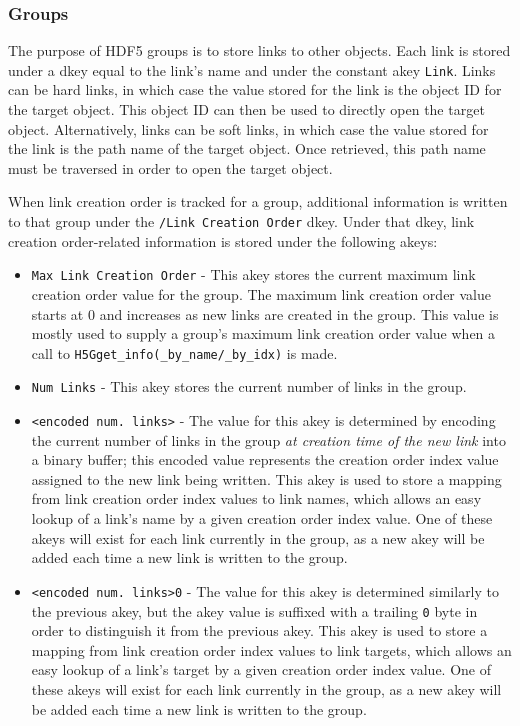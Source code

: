\newpage

\subsubsection{Groups}

The purpose of HDF5 groups is to store links to other objects. Each link is stored under a dkey equal to the link's name and under the constant akey \verb+Link+. Links can be hard links, in which case the value stored for the link is the object ID for the target object. This object ID can then be used to directly open the target object. Alternatively, links can be soft links, in which case the value stored for the link is the path name of the target object. Once retrieved, this path name must be traversed in order to open the target object.

When link creation order is tracked for a group, additional information is written to that group under the \verb+/Link Creation Order+ dkey. Under that dkey, link creation order-related information is stored under the following akeys:

\begin{itemize}
    \item \verb+Max Link Creation Order+ - This akey stores the current maximum link creation order value for the group. The maximum link creation order value starts at 0 and increases as new links are created in the group. This value is mostly used to supply a group's maximum link creation order value when a call to \verb+H5Gget_info(_by_name/_by_idx)+ is made.
    \item \verb+Num Links+ - This akey stores the current number of links in the group.
    \item \verb+<encoded num. links>+ - The value for this akey is determined by encoding the current number of links in the group \textit{at creation time of the new link} into a binary buffer; this encoded value represents the creation order index value assigned to the new link being written. This akey is used to store a mapping from link creation order index values to link names, which allows an easy lookup of a link's name by a given creation order index value. One of these akeys will exist for each link currently in the group, as a new akey will be added each time a new link is written to the group.
    \item \verb+<encoded num. links>0+ - The value for this akey is determined similarly to the previous akey, but the akey value is suffixed with a trailing \verb+0+ byte in order to distinguish it from the previous akey. This akey is used to store a mapping from link creation order index values to link targets, which allows an easy lookup of a link's target by a given creation order index value. One of these akeys will exist for each link currently in the group, as a new akey will be added each time a new link is written to the group.
\end{itemize}

